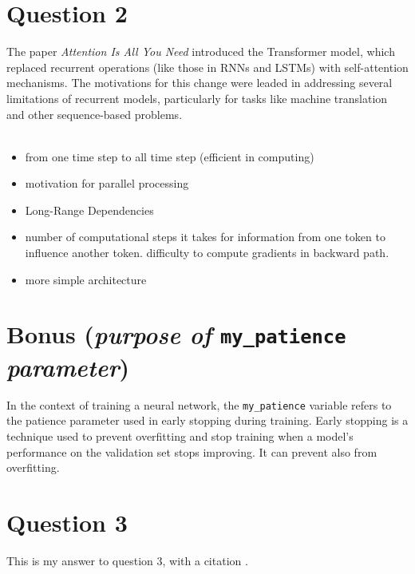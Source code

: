 \documentclass[a4paper]{article}
\begin{document}
\section{Question 2}
\noindent
The paper \textit{Attention Is All You Need} introduced the Transformer model, which replaced recurrent operations (like those in RNNs and LSTMs) with self-attention mechanisms. The motivations for this change were leaded in addressing several limitations of recurrent models, particularly for tasks like machine translation and other sequence-based problems.
\\
\\
\noindent
\begin{itemize}
    \item from one time step to all time step (efficient in computing)
    \item motivation for parallel processing
    \item Long-Range Dependencies
    \item number of computational steps it takes for information from one token to influence another token. difficulty to compute gradients in backward path.
    \item more simple architecture
\end{itemize}

\section{Bonus (\textit{purpose of} \texttt{my\_patience} \textit{parameter})}
\noindent
In the context of training a neural network, the \texttt{my\_patience} variable refers to the patience parameter used in early stopping during training. Early stopping is a technique used to prevent overfitting and stop training when a model’s performance on the validation set stops improving. It can prevent also from overfitting.

\section{Question 3}

This is my answer to question 3, with a citation \cite{vaswani2017attention}. 



\end{document}
